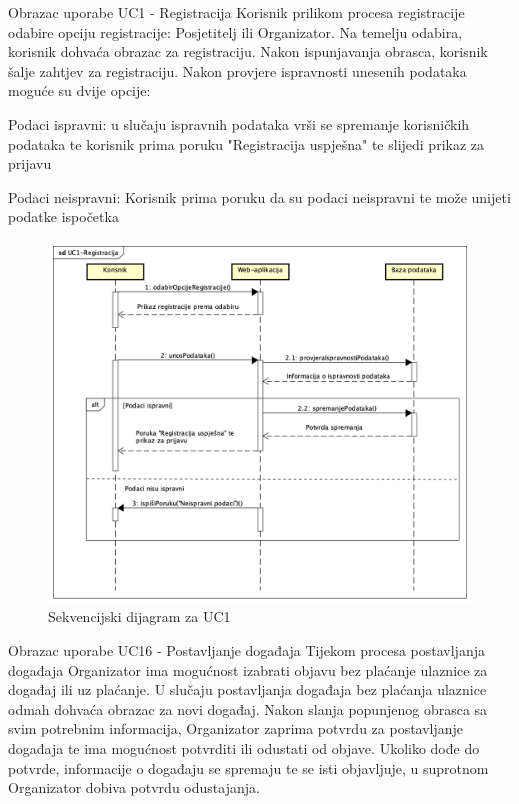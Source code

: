 	
				\LARGE {Obrazac uporabe UC1 - Registracija}
				\newline
				\normalsize
				Korisnik prilikom procesa registracije odabire opciju registracije: Posjetitelj ili Organizator. Na temelju odabira, korisnik dohvaća obrazac za registraciju. Nakon ispunjavanja obrasca, korisnik šalje zahtjev za registraciju. Nakon provjere ispravnosti unesenih podataka moguće su dvije opcije:
				
				\begin{packed_item}
					\item {Podaci ispravni:} u slučaju ispravnih podataka vrši se spremanje korisničkih podataka te korisnik prima poruku "Registracija uspješna" te slijedi prikaz za prijavu
					\item {Podaci neispravni:} Korisnik prima poruku da su podaci neispravni te može unijeti podatke ispočetka
				\end{packed_item}
				
				\begin{figure}[H]
					\includegraphics[scale=0.5]{dijagrami/sd-UC1-Registracija.png} %
					\centering
					\caption{Sekvencijski dijagram za UC1}
					\label{fig:promjene}
				\end{figure}
				\eject		
				
				\LARGE {Obrazac uporabe UC16 - Postavljanje događaja}
				\newline
				\normalsize
				Tijekom procesa postavljanja događaja Organizator ima mogućnost izabrati objavu bez plaćanje ulaznice za događaj ili uz plaćanje. U slučaju postavljanja događaja bez plaćanja ulaznice odmah dohvaća obrazac za novi događaj. 
				Nakon slanja popunjenog obrasca sa svim potrebnim informacija, Organizator zaprima potvrdu za postavljanje događaja te ima mogućnost potvrditi ili odustati od objave. Ukoliko dođe do potvrde, informacije o događaju se spremaju te se isti objavljuje, u suprotnom Organizator dobiva potvrdu odustajanja.
				
